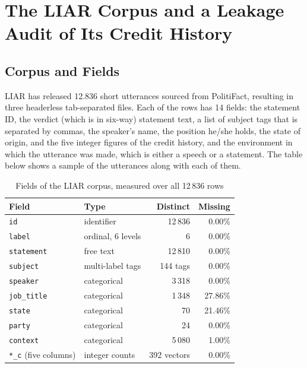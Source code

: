 \documentclass[10pt,twocolumn,twoside,a4paper]{article}
\begin{document}
\section{The LIAR Corpus and a Leakage Audit of Its Credit History}

\subsection{Corpus and Fields}

LIAR \cite{wang2017liar} has released 12.836 short utterances sourced from PolitiFact, resulting in three headerless tab-separated files. Each of the rows has 14 fields: the statement ID, the verdict (which is in six-way) statement text, a list of subject tags that is separated by commas, the speaker's name, the position he/she holds, the state of origin, and the five integer figures of the credit history, and the environment in which the utterance was made, which is either a speech or a statement. The table below shows a sample of the utterances along with each of them.

\begin{table}[t]
\caption{Fields of the LIAR corpus, measured over all 12\,836 rows}
\label{tab:fields}
\centering
\footnotesize
\begin{tabular}{@{}llrr@{}}
\toprule
Field & Type & Distinct & Missing \\
\midrule
\texttt{id}            & identifier   & 12\,836 & 0.00\% \\
\texttt{label}         & ordinal, 6 levels & 6  & 0.00\% \\
\texttt{statement}     & free text    & 12\,810 & 0.00\% \\
\texttt{subject}       & multi-label tags & 144 tags & 0.00\% \\
\texttt{speaker}       & categorical  & 3\,318 & 0.00\% \\
\texttt{job\_title}    & categorical  & 1\,348 & 27.86\% \\
\texttt{state}         & categorical  & 70     & 21.46\% \\
\texttt{party}         & categorical  & 24     & 0.00\% \\
\texttt{context}       & categorical  & 5\,080 & 1.00\% \\
\texttt{*\_c} (five columns) & integer counts & 392 vectors & 0.00\% \\
\bottomrule
\end{tabular}
\end{table}
\end{document}

